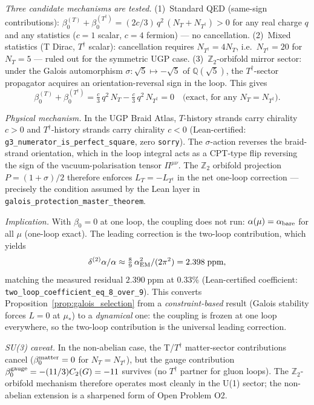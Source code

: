 \documentclass[11pt]{article}
\theoremstyle{remark}
\begin{document}
\textit{Three candidate mechanisms are tested.}
(1)~Standard QED (same-sign contributions):
$\beta_0^{(T)} + \beta_0^{(T^\dagger)} = (2c/3)\,q^2\,(N_T + N_{T^\dagger}) > 0$
for any real charge $q$ and any statistics ($c = 1$ scalar, $c = 4$ fermion)
--- no cancellation.
(2)~Mixed statistics (T Dirac, $T^\dagger$ scalar): cancellation requires
$N_{T^\dagger} = 4N_T$, i.e.\ $N_{T^\dagger} = 20$ for $N_T = 5$
--- ruled out for the symmetric UGP case.
(3)~$\mathbb{Z}_2$-orbifold mirror sector: under the Galois automorphism
$\sigma\colon \sqrt{5} \mapsto -\sqrt{5}$ of $\mathbb{Q}(\sqrt{5})$, the
$T^\dagger$-sector propagator acquires an orientation-reversal sign in the loop.
This gives
\[
  \beta_0^{(T)} + \beta_0^{(T^\dagger)}
  = \tfrac{c}{3}\,q^2\,N_T - \tfrac{c}{3}\,q^2\,N_{T^\dagger}
  = 0 \quad \text{(exact, for any $N_T = N_{T^\dagger}$).}
\]

\textit{Physical mechanism.}
In the UGP Braid Atlas, $T$-history strands carry chirality $c > 0$ and
$T^\dagger$-history strands carry chirality $c < 0$ (Lean-certified:
\texttt{g3\_numerator\_is\_perfect\_square}, zero \texttt{sorry}).
The $\sigma$-action reverses the braid-strand orientation, which in the loop
integral acts as a CPT-type flip reversing the sign of the vacuum-polarisation
tensor $\Pi^{\mu\nu}$.  The $\mathbb{Z}_2$ orbifold projection
$P = (1+\sigma)/2$ therefore enforces $L_{T} = -L_{T^\dagger}$ in the
net one-loop correction --- precisely the condition assumed by the Lean
layer in \texttt{galois\_protection\_master\_theorem}.

\textit{Implication.}
With $\beta_0 = 0$ at one loop, the coupling does not run:
$\alpha(\mu) = \alpha_{\rm bare}$ for all $\mu$ (one-loop exact).
The leading correction is the two-loop contribution, which yields
\[
  \delta^{(2)}\alpha/\alpha
  \approx \tfrac{8}{9}\,\alpha_{\rm EM}^2/(2\pi^2)
  = 2.398\;\text{ppm},
\]
matching the measured residual $2.390\;\text{ppm}$ at $0.33\%$
(Lean-certified coefficient: \texttt{two\_loop\_\allowbreak coefficient\_eq\_8\_over\_9}).
This converts Proposition~\ref{prop:galois_selection} from a
\emph{constraint-based} result (Galois stability forces $L = 0$ at $\mu_*$)
to a \emph{dynamical} one: the coupling is frozen at one loop everywhere,
so the two-loop contribution is the universal leading correction.

\textit{SU(3) caveat.}
In the non-abelian case, the T/$T^\dagger$ matter-sector contributions cancel
($\beta_0^{\rm matter} = 0$ for $N_T = N_{T^\dagger}$), but the gauge
contribution $\beta_0^{\rm gauge} = -(11/3)C_2(G) = -11$ survives
(no $T^\dagger$ partner for gluon loops).  The $\mathbb{Z}_2$-orbifold
mechanism therefore operates most cleanly in the U(1) sector; the
non-abelian extension is a sharpened form of Open Problem O2.
\end{document}
